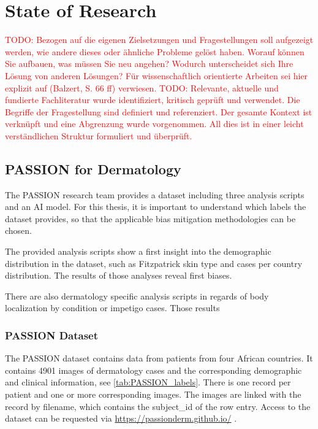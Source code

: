 \documentclass[12pt, a4paper, oneside]{book}   	%
\renewcommand{\todo}[1]{\textcolor{red}{TODO: #1}}
\begin{document}
	\chapter{State of Research}
		\todo{Bezogen auf die eigenen Zielsetzungen und Fragestellungen soll aufgezeigt werden, wie andere dieses oder ähnliche Probleme gelöst haben. Worauf können Sie aufbauen, was müssen Sie neu angehen?	Wodurch unterscheidet sich Ihre Lösung von anderen Lösungen? Für wissenschaftlich orientierte Arbeiten sei hier explizit auf (Balzert, S. 66 ff) verwiesen.}
		\todo{Relevante, aktuelle und fundierte Fachliteratur wurde identifiziert, kritisch geprüft und verwendet. Die Begriffe der Fragestellung sind definiert und referenziert. Der gesamte Kontext ist verknüpft und eine Abgrenzung wurde vorgenommen. All dies ist in einer leicht verständlichen Struktur formuliert und überprüft.}
		
		
		\section{PASSION for Dermatology}
			The PASSION research team provides a dataset including three analysis scripts and an AI model. For this thesis, it is important to understand which labels the dataset provides, so that the applicable bias mitigation methodologies can be chosen.
			
			The provided analysis scripts show a first insight into the demographic distribution in the dataset, such as Fitzpatrick skin type and cases per country distribution. The results of those analyses reveal first biases.
			
			There are also dermatology specific analysis scripts in regards of body localization by condition or impetigo cases. Those results 
			
			\subsection{PASSION Dataset}
				The PASSION dataset contains data from patients from four African countries. It contains 4901 images of dermatology cases and the corresponding demographic and clinical information, see \autoref{tab:PASSION_labels}. There is one record per patient and one or more corresponding images. The images are linked with the record by filename, which contains the subject\_id of the row entry. Access to the dataset can be requested via \href{https://passionderm.github.io/}{https://passionderm.github.io/} \autocite{Gottfrois2024}.
				
\end{document}
